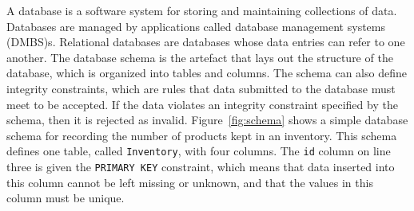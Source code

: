 A database is a software system for storing and maintaining collections of data. Databases
are managed by applications called database management systems (DMBS)s. Relational databases are
databases whose data entries can refer to one another. The database schema is the artefact that
lays out the structure of the database, which is organized into tables and columns. The schema can also
define integrity constraints, which are rules that data submitted to the database must meet to be
accepted. If the data violates an integrity constraint specified by the schema, then it is rejected as
invalid. Figure~\ref{fig:schema} shows a simple database schema for recording the number of products
kept in an inventory. This schema defines one table, called \texttt{Inventory}, with four columns.
The \texttt{id} column on line three is given the \texttt{PRIMARY KEY} constraint, which means that
data inserted into this column cannot be left missing or unknown, and that the values in this column
must be unique.
